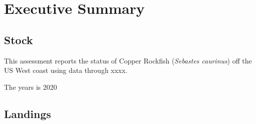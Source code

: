 \documentclass[11pt,
  english,
  a4paper,
]{article}
\begin{document}
\newcommand{\lt}{\ensuremath <}
\newcommand{\gt}{\ensuremath >}

\newlength{\cslhangindent}
\setlength{\cslhangindent}{1.5em}
\newenvironment{cslreferences}%
  {\setlength{\parindent}{0pt}%
  \everypar{\setlength{\hangindent}{\cslhangindent}}\ignorespaces}%
  {\par}

\pagebreak
{}
\setcounter{page}{1}


\hypertarget{executive-summary}{%
\section*{Executive Summary}\label{executive-summary}}

\leavevmode\tagmcend\tagstructend


\hypertarget{stock}{%
\subsection*{Stock}\label{stock}}

\leavevmode\tagmcend\tagstructend


This assessment reports the status of Copper Rockfish (\emph{Sebastes caurinus}) off the US West coast using data through xxxx.

\leavevmode\tagmcend\tagstructend\par


The years is 2020

\leavevmode\tagmcend\tagstructend\par


\hypertarget{landings}{%
\subsection*{Landings}\label{landings}}

\leavevmode\tagmcend\tagstructend
\end{document}
